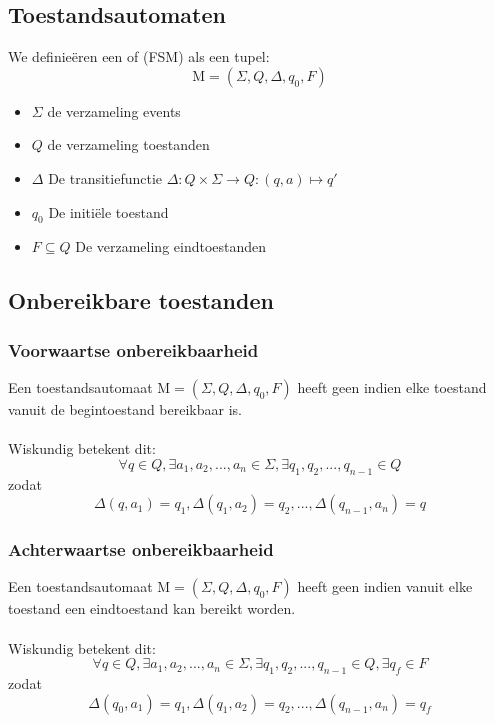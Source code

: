 \documentclass[../../main.tex]{subfiles}
\begin{document}
\subsection{Toestandsautomaten}
We definie\"eren een  of  (FSM) als een tupel:
\begin{equation}
\boxed{\text{M} =  (\Sigma,Q,\Delta,q_0,F)}
\end{equation}
\begin{itemize}
	\item $\Sigma$ de verzameling events
	\item $Q$ de verzameling toestanden
	\item $\Delta$ De transitiefunctie $\Delta: Q \times \Sigma \rightarrow Q: (q,a) \mapsto q'$
	\item $q_0$ De initi\"ele toestand
	\item $F \subseteq Q$  De verzameling eindtoestanden
\end{itemize}
\subsection{Onbereikbare toestanden}
\subsubsection{Voorwaartse onbereikbaarheid}
Een toestandsautomaat $\text{M} =  (\Sigma,Q,\Delta,q_0,F)$ heeft geen  indien elke toestand vanuit de begintoestand bereikbaar is.\\
\\
Wiskundig betekent dit:
\begin{equation*}
	\forall q \in Q, \exists a_1, a_2,..., a_n \in \Sigma, \exists q_1, q_2, ..., q_{n-1} \in Q
\end{equation*}
zodat
\begin{equation*}
	\Delta(q,a_1) = q_1, \Delta(q_1,a_2) = q_2 , ..., \Delta(q_{n-1},a_n) = q
\end{equation*}

\subsubsection{Achterwaartse onbereikbaarheid}
Een toestandsautomaat $\text{M} =  (\Sigma,Q,\Delta,q_0,F)$ heeft geen  indien vanuit elke toestand een eindtoestand kan bereikt worden.\\
\\
Wiskundig betekent dit:
\begin{equation*}
	\forall q \in Q, \exists a_1, a_2,..., a_n \in \Sigma, \exists q_1, q_2, ..., q_{n-1} \in Q, \exists q_f \in F
\end{equation*}
zodat
\begin{equation*}
	\Delta(q_0,a_1) = q_1, \Delta(q_1,a_2) = q_2 , ..., \Delta(q_{n-1},a_n) = q_f
\end{equation*}
\end{document}
